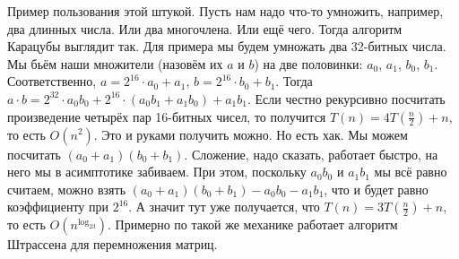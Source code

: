 \documentclass{article}
\begin{document}
    Пример пользования этой штукой. Пусть нам надо что-то умножить, например, два длинных числа. Или два многочлена. Или ещё чего. Тогда алгоритм Карацубы выглядит так. Для примера мы будем умножать два 32-битных числа. Мы бьём наши множители (назовём их $a$ и $b$) на две половинки: $a_0$, $a_1$, $b_0$, $b_1$. Соответственно, $a=2^{16}\cdot a_0+a_1$, $b=2^{16}\cdot b_0+b_1$. Тогда $a\cdot b=2^{32}\cdot a_0b_0+2^{16}\cdot(a_0b_1+a_1b_0)+a_1b_1$. Если честно рекурсивно посчитать произведение четырёх пар 16-битных чисел, то получится $T(n)=4T\left(\frac n2\right)+n$, то есть $O(n^2)$. Это и руками получить можно. Но есть хак. Мы можем посчитать $(a_0+a_1)(b_0+b_1)$. Сложение, надо сказать, работает быстро, на него мы в асимптотике забиваем. При этом, поскольку $a_0b_0$ и $a_1b_1$ мы всё равно считаем, можно взять $(a_0+a_1)(b_0+b_1)-a_0b_0-a_1b_1$, что и будет равно коэффициенту при $2^{16}$. А значит тут уже получается, что $T(n)=3T\left(\frac n2\right)+n$, то есть $O(n^{\log_23})$. Примерно по такой же механике работает алгоритм Штрассена для перемножения матриц.
\end{document}
